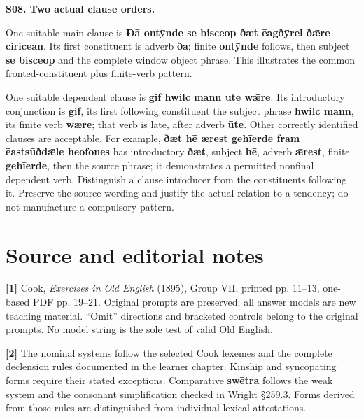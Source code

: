 \par\begin{minipage}{\linewidth}\raggedright
\textbf{S08. Two actual clause orders.}

One suitable main clause is \textbf{Ðā ontȳnde se bisceop ðæt ēagðȳrel ðǣre ciricean}. Its first constituent is adverb \textbf{ðā}; finite \textbf{ontȳnde} follows, then subject \textbf{se bisceop} and the complete window object phrase. This illustrates the common fronted-constituent plus finite-verb pattern.

One suitable dependent clause is \textbf{gif hwilc mann ūte wǣre}. Its introductory conjunction is \textbf{gif}, its first following constituent the subject phrase \textbf{hwilc mann}, its finite verb \textbf{wǣre}; that verb is late, after adverb \textbf{ūte}. Other correctly identified clauses are acceptable. For example, \textbf{ðæt hē ǣrest gehīerde fram ēastsūðdǣle heofones} has introductory \textbf{ðæt}, subject \textbf{hē}, adverb \textbf{ǣrest}, finite \textbf{gehīerde}, then the source phrase; it demonstrates a permitted nonfinal dependent verb. Distinguish a clause introducer from the constituents following it. Preserve the source wording and justify the actual relation to a tendency; do not manufacture a compulsory pattern.

\end{minipage}\par\addvspace{4pt}

\section*{Source and editorial notes}

\begingroup\fontsize{10}{12.8}\selectfont
\textbf{[1]} Cook, \emph{Exercises in Old English} (1895), Group VII, printed pp. 11–13, one-based PDF pp. 19–21. Original prompts are preserved; all answer models are new teaching material. “Omit” directions and bracketed controls belong to the original prompts. No model string is the sole test of valid Old English.

\textbf{[2]} The nominal systems follow the selected Cook lexemes and the complete declension rules documented in the learner chapter. Kinship and syncopating forms require their stated exceptions. Comparative \textbf{swētra} follows the weak system and the consonant simplification checked in Wright §259.3. Forms derived from those rules are distinguished from individual lexical attestations.

